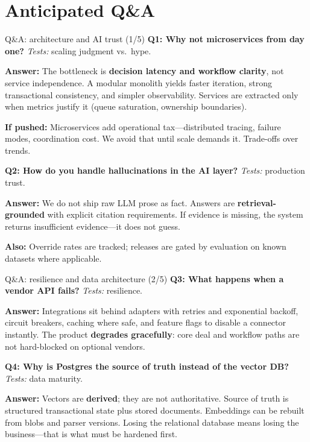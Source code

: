 \documentclass[aspectratio=169,11pt]{beamer}
\begin{document}
\section{Anticipated Q\&A}

\begin{frame}{Q\&A: architecture and AI trust (1/5)}
  \footnotesize
  \textbf{Q1: Why not microservices from day one?}
  \textit{Tests:} scaling judgment vs.\ hype.

  \textbf{Answer:} The bottleneck is \textbf{decision latency and workflow clarity}, not service independence. A modular monolith yields faster iteration, strong transactional consistency, and simpler observability. Services are extracted only when metrics justify it (queue saturation, ownership boundaries).

  \textbf{If pushed:} Microservices add operational tax---distributed tracing, failure modes, coordination cost. We avoid that until scale demands it. Trade-offs over trends.

  \vspace{0.4em}
  \textbf{Q2: How do you handle hallucinations in the AI layer?}
  \textit{Tests:} production trust.

  \textbf{Answer:} We do not ship raw LLM prose as fact. Answers are \textbf{retrieval-grounded} with explicit citation requirements. If evidence is missing, the system returns insufficient evidence---it does not guess.

  \textbf{Also:} Override rates are tracked; releases are gated by evaluation on known datasets where applicable.
\end{frame}

\begin{frame}{Q\&A: resilience and data architecture (2/5)}
  \footnotesize
  \textbf{Q3: What happens when a vendor API fails?}
  \textit{Tests:} resilience.

  \textbf{Answer:} Integrations sit behind adapters with retries and exponential backoff, circuit breakers, caching where safe, and feature flags to disable a connector instantly. The product \textbf{degrades gracefully}: core deal and workflow paths are not hard-blocked on optional vendors.

  \vspace{0.4em}
  \textbf{Q4: Why is Postgres the source of truth instead of the vector DB?}
  \textit{Tests:} data maturity.

  \textbf{Answer:} Vectors are \textbf{derived}; they are not authoritative. Source of truth is structured transactional state plus stored documents. Embeddings can be rebuilt from blobs and parser versions. Losing the relational database means losing the business---that is what must be hardened first.
\end{frame}
\end{document}
